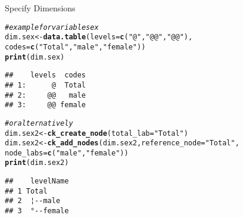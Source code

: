 \documentclass{beamer}\usepackage[]{graphicx}\usepackage[]{color}
\makeatletter
\newcommand{\hlstr}[1]{\textcolor[rgb]{0.192,0.494,0.8}{#1}}%
\newcommand{\hlcom}[1]{\textcolor[rgb]{0.678,0.584,0.686}{\textit{#1}}}%
\newcommand{\hlstd}[1]{\textcolor[rgb]{0.345,0.345,0.345}{#1}}%
\newcommand{\hlkwb}[1]{\textcolor[rgb]{0.69,0.353,0.396}{#1}}%
\newcommand{\hlkwc}[1]{\textcolor[rgb]{0.333,0.667,0.333}{#1}}%
\newcommand{\hlkwd}[1]{\textcolor[rgb]{0.737,0.353,0.396}{\textbf{#1}}}%
\newenvironment{kframe}{%
 \def\at@end@of@kframe{}%
 \ifinner\ifhmode%
  \def\at@end@of@kframe{\end{minipage}}%
  \begin{minipage}{\columnwidth}%
 \fi\fi%
 \def\FrameCommand##1{\hskip\@totalleftmargin \hskip-\fboxsep
 \colorbox{shadecolor}{##1}\hskip-\fboxsep
     \hskip-\linewidth \hskip-\@totalleftmargin \hskip\columnwidth}%
 \MakeFramed {\advance\hsize-\width
   \@totalleftmargin\z@ \linewidth\hsize
   \@setminipage}}%
 {\par\unskip\endMakeFramed%
 \at@end@of@kframe}
\newenvironment{knitrout}{}{} %
\makeatother
\begin{document}
\begin{frame}[fragile]{Specify Dimensions}

\begin{knitrout}\footnotesize
{}\color{fgcolor}\begin{kframe}
\begin{alltt}
\hlcom{# example for variable sex}
\hlstd{dim.sex} \hlkwb{<-} \hlkwd{data.table}\hlstd{(}\hlkwc{levels}\hlstd{=}\hlkwd{c}\hlstd{(}\hlstr{"@"}\hlstd{,}\hlstr{"@@"}\hlstd{,}\hlstr{"@@"}\hlstd{),}
                      \hlkwc{codes}\hlstd{=}\hlkwd{c}\hlstd{(}\hlstr{"Total"}\hlstd{,} \hlstr{"male"}\hlstd{,} \hlstr{"female"}\hlstd{))}
\hlkwd{print}\hlstd{(dim.sex)}
\end{alltt}
\begin{verbatim}
##    levels  codes
## 1:      @  Total
## 2:     @@   male
## 3:     @@ female
\end{verbatim}
\end{kframe}
\end{knitrout}

\begin{knitrout}\footnotesize
{}\color{fgcolor}\begin{kframe}
\begin{alltt}
\hlcom{# or alternatively}
\hlstd{dim.sex2} \hlkwb{<-} \hlkwd{ck_create_node}\hlstd{(}\hlkwc{total_lab}\hlstd{=}\hlstr{"Total"}\hlstd{)}
\hlstd{dim.sex2} \hlkwb{<-} \hlkwd{ck_add_nodes}\hlstd{(dim.sex2,} \hlkwc{reference_node}\hlstd{=}\hlstr{"Total"}\hlstd{,}
                         \hlkwc{node_labs}\hlstd{=}\hlkwd{c}\hlstd{(}\hlstr{"male"}\hlstd{,}\hlstr{"female"}\hlstd{))}
\hlkwd{print}\hlstd{(dim.sex2)}
\end{alltt}
\begin{verbatim}
##    levelName
## 1 Total     
## 2  ¦--male  
## 3  °--female
\end{verbatim}
\end{kframe}
\end{knitrout}
\end{frame}
\end{document}
